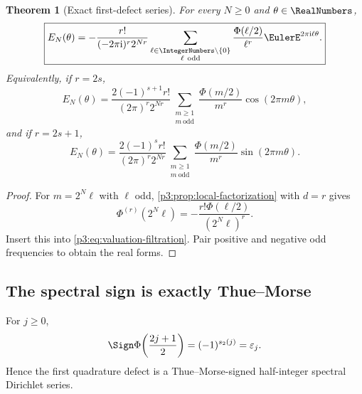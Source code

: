 \documentclass[11pt,oneside]{article}
\numberwithin{equation}{section}
\newtheorem{theorem}{Theorem}[section]
\theoremstyle{definition}
\theoremstyle{remark}
\newcommand{\eps}{\varepsilon}
\begin{document}
\begin{theorem}[Exact first-defect series]
\label{p3:thm:first-defect}
For every $N\ge0$ and $\theta\in\RealNumbers$,
\begin{equation}
 \boxed{\displaystyle
 E_N(\theta)
 =-\frac{r!}{(-2\pi\iu)^r2^{Nr}}
 \sum_{\substack{\ell\in\IntegerNumbers\setminus\{0\}\\\ell\ \mathrm{odd}}}
 \frac{\Phi(\ell/2)}{\ell^r}
 \EulerE^{2\pi\iu\ell\theta}.}
 \label{p3:eq:first-defect-complex}
\end{equation}
Equivalently, if $r=2s$,
\begin{equation}
 E_N(\theta)
 =\frac{2(-1)^{s+1}r!}{(2\pi)^r2^{Nr}}
 \sum_{\substack{m\ge1\\m\ \mathrm{odd}}}
 \frac{\Phi(m/2)}{m^r}\cos(2\pi m\theta),
 \label{p3:eq:first-defect-even}
\end{equation}
and if $r=2s+1$,
\begin{equation}
 E_N(\theta)
 =\frac{2(-1)^sr!}{(2\pi)^r2^{Nr}}
 \sum_{\substack{m\ge1\\m\ \mathrm{odd}}}
 \frac{\Phi(m/2)}{m^r}\sin(2\pi m\theta).
 \label{p3:eq:first-defect-odd}
\end{equation}
\end{theorem}

\begin{proof}
For $m=2^N\ell$ with $\ell$ odd, \cref{p3:prop:local-factorization} with $d=r$ gives
\begin{equation}
 \Phi^{(r)}(2^N\ell)
 =-\frac{r!\Phi(\ell/2)}{(2^N\ell)^r}.
 \label{p3:eq:first-zero-jet}
\end{equation}
Insert this into \eqref{p3:eq:valuation-filtration}.  Pair positive and negative odd frequencies to obtain the real forms.
\end{proof}

\subsection{The spectral sign is exactly Thue--Morse}

\begin{proposition}
\label{p3:prop:half-integer-sign}
For $j\ge0$,
\begin{equation}
 \Sign\Phi\!\left(\frac{2j+1}{2}\right)
 =(-1)^{s_2(j)}=\eps_j.
 \label{p3:eq:half-integer-sign}
\end{equation}
Hence the first quadrature defect is a Thue--Morse-signed half-integer spectral Dirichlet series.
\end{proposition}
\end{document}
